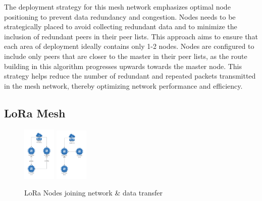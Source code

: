 The deployment strategy for this mesh network emphasizes optimal node positioning to prevent data redundancy and congestion. Nodes needs to be strategically placed to avoid collecting redundant data and to minimize the inclusion of redundant peers in their peer lists. This approach aims to ensure that each area of deployment ideally contains only 1-2 nodes. Nodes are configured to include only peers that are closer to the master in their peer lists, as the route building in this algorithm progresses upwards towards the master node. This strategy helps reduce the number of redundant and repeated packets transmitted in the mesh network, thereby optimizing network performance and efficiency.

\subsection{LoRa Mesh}\label{sec:loramesh}
\begin{figure}[H]
  \begin{center}
    \includegraphics[width=0.14\textwidth]{Figures/LoRa/lora_structure_1.png}
    \includegraphics[width=0.14\textwidth]{Figures/LoRa/lora_structure_2.png}
  \end{center}
  \caption{LoRa Nodes joining network \& data transfer}
\end{figure}

